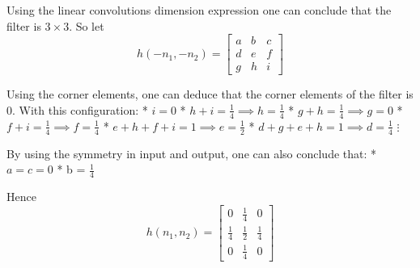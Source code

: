 \documentclass[11pt]{article}
\begin{document}
Using the linear convolutions dimension expression one can conclude that
the filter is \(3\times 3\). So let
\[h(-n_1,-n_2) = \begin{bmatrix} a & b & c \\  d & e & f \\ g & h & i \end{bmatrix}\]

Using the corner elements, one can deduce that the corner elements of
the filter is 0. With this configuration: * \(i = 0\) *
\(h + i = \frac{1}{4} \implies h = \frac{1}{4}\) *
\(g + h = \frac{1}{4} \implies g = 0\) *
\(f + i = \frac{1}{4} \implies f = \frac{1}{4}\) *
\(e + h + f + i = 1 \implies e = \frac{1}{2}\) *
\(d + g + e + h = 1 \implies d = \frac{1}{4}\) \(\vdots\)

By using the symmetry in input and output, one can also conclude that: *
\(a = c = 0\) * b = \(\frac{1}{4}\)

Hence
\[h(n_1,n_2) = \begin{bmatrix} 0 & \frac{1}{4} & 0 \\  \frac{1}{4} & \frac{1}{2} & \frac{1}{4} \\ 0 & \frac{1}{4} & 0 \end{bmatrix}\]
\end{document}
